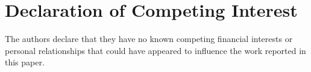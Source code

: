 \documentclass[12pt]{article}
\begin{document}
\section*{Declaration of Competing Interest}

The authors declare that they have no known competing financial interests or personal relationships that could have appeared to influence the work reported in this paper.
\end{document}
